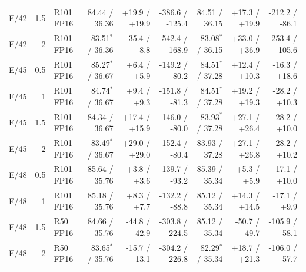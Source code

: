 \begin{tabular}{@{}lrlrrrrrr@{}}
E/42 & 1.5 & R101 FP16 & 84.44 / 36.36 & +19.9 / +19.9 & -386.6 / -125.4 & 84.51 / 36.15 & +17.3 / +19.9 & -212.2 / -86.1\\
E/42 & 2 & R101 FP16 & 83.51$^*$ / 36.36 & -35.4 / -8.8 & -542.4 / -168.9 & 83.08$^*$ / 36.15 & +33.0 / +36.9 & -253.4 / -105.6\\
E/45 & 0.5 & R101 FP16 & 85.27$^*$ / 36.67 & +6.4 / +5.9 & -149.2 / -80.2 & 84.51$^*$ / 37.28 & +12.4 / +10.3 & -16.3 / +18.6\\
E/45 & 1 & R101 FP16 & 84.74$^*$ / 36.67 & +9.4 / +9.3 & -151.8 / -81.3 & 84.51$^*$ / 37.28 & +19.2 / +19.3 & -28.2 / +10.3\\
E/45 & 1.5 & R101 FP16 & 84.34 / 36.67 & +17.4 / +15.9 & -146.0 / -80.0 & 83.93$^*$ / 37.28 & +27.1 / +26.4 & -28.2 / +10.0\\
E/45 & 2 & R101 FP16 & 83.49$^*$ / 36.67 & +29.0 / +29.0 & -152.4 / -80.4 & 83.93 / 37.28 & +27.1 / +26.8 & -28.2 / +10.2\\
E/48 & 0.5 & R101 FP16 & 85.64 / 35.76 & +3.8 / +3.6 & -139.7 / -93.2 & 85.39 / 35.34 & +5.3 / +5.9 & -17.1 / +10.0\\
E/48 & 1 & R101 FP16 & 85.18 / 35.76 & +8.3 / +7.7 & -132.2 / -88.8 & 85.12 / 35.34 & +14.3 / +14.5 & -17.1 / +9.9\\
E/48 & 1.5 & R50 FP16 & 84.66 / 35.76 & -44.8 / -42.9 & -303.8 / -224.5 & 85.12 / 35.34 & -50.7 / -49.7 & -105.9 / -58.1\\
E/48 & 2 & R50 FP16 & 83.65$^*$ / 35.76 & -15.7 / -13.1 & -304.2 / -226.8 & 82.29$^*$ / 35.34 & +18.7 / +21.3 & -106.0 / -57.7\\
\bottomrule
\end{tabular}
